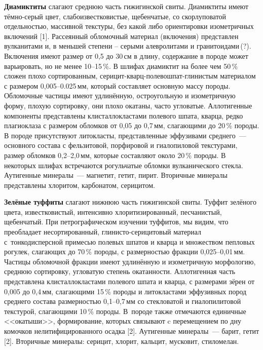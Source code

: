 \textbf{Диамиктиты} слагают среднюю часть гижигинской свиты. Диамиктиты имеют тёмно-серый цвет, слабоизвестковистые, щебенчатые, со скорлуповатой отдельностью, массивной текстуры, без какой либо ориентировки изометричных включений [1]. Рассеянный обломочный материал (включения) представлен вулканитами и, в меньшей степени – серыми алевролитами и гранитоидами\,(?). Включения имеют размер от 0,5 до 30\,см в длину, содержание в породе может варьировать, но не менее 10--15\,\%. В шлифах диамиктит на более чем 50\,\% сложен плохо сортированным, серицит-кварц-полевошпат-глинистым материалом с размером 0,005--0.025\,мм, который составляет основную массу породы. Обломочные частицы имеют удлинённую, остроугольную и изометричную форму, плохую сортировку, они плохо окатаны, часто угловатые. Аллотигенные компоненты представлены клисталлокластами полевого шпата, кварца, редко плагиоклаза с размером обломков от 0,05 до 0,7\,мм, слагающими до 20\,\% породы. В породе присутствуют литокласты, представленные эффузивами среднего~--- основного состава с фельзитовой, порфировой и гиалопиловой текстурами, размер обломков 0,2--2,0\,мм, которые составляют около 20\,\% породы. В некоторых шлифах  встречаются рогульчатые обломки вулканического стекла. Аутигенные минералы~--- магнетит, гетит, пирит. Вторичные минералы представлены хлоритом, карбонатом, серицитом.

\textbf{Зелёные туффиты} слагают нижнюю часть гижигинской свиты. Туффит зелёного цвета, известковистый, интенсивно хлоритизированный, песчанистый, щебенчатый. При петрографическом изучении туффитов, мы видим, что преобладает несортированный, глинисто-серицитовый материал с~тонкодисперсной примесью полевых шпатов и кварца и множеством пепловых рогулек, слагающих до 70\,\% породы, с размерностью фракции 0,025--0,01\,мм. Частицы обломочной фракции имеют удлинённую и изометричную морфологию, среднюю сортировку, угловатую степень окатанности. Аллотигенная часть представлена клисталлокластами полевого шпата и кварца, с размерами зёрен от 0,005 до 0,4\,мм, слагающими 15\,\% породы и литокластами эффузивных пород среднего состава размерностью 0,1--0,7\,мм со стекловатой и гиалопилитовой текстурой, слагающими 10\,\% породы. В~породе также отмечаются единичные <<окатыши>>, формирование, которых связывают c перемещением по дну комочков нелитифицированного осадка [2]. Аутигенные минералы~--- барит, гетит [2]. Вторичные минералы: серицит, хлорит, кальцит, мусковит, стиломелан.

